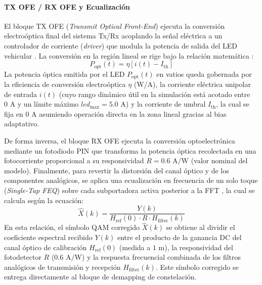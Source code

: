 \paragraph{TX OFE / RX OFE y Ecualización}
El bloque TX OFE (\textit{Transmit Optical Front-End}) ejecuta la conversión electroóptica final del sistema Tx/Rx acoplando la señal eléctrica a un controlador de corriente (\textit{driver}) que modula la potencia de salida del LED vehicular \cite{ghassemlooy2019optical}. La conversión en la región lineal se rige bajo la relación matemática \cite{ghassemlooy2019optical}:
\begin{equation}
	P_{\text{opt}}(t) = \eta \left[ i(t) - I_{\text{th}} \right]
	\label{eq:p_opt_conv}
\end{equation}
La potencia óptica emitida por el LED $P_{\text{opt}}(t)$ en vatios queda gobernada por la eficiencia de conversión electroóptica $\eta$ (W/A), la corriente eléctrica unipolar de entrada $i(t)$ (cuyo rango dinámico útil en la simulación está acotado entre $0\text{~A}$ y un límite máximo $led_{\text{max}} = 5.0\text{~A}$) y la corriente de umbral $I_{\text{th}}$, la cual se fija en $0\text{~A}$ asumiendo operación directa en la zona lineal gracias al bias adaptativo.

De forma inversa, el bloque RX OFE ejecuta la conversión optoelectrónica mediante un fotodiodo PIN que transforma la potencia óptica recolectada en una fotocorriente proporcional a su responsividad $R = 0.6\text{ A/W}$ (valor nominal del modelo). Finalmente, para revertir la distorsión del canal óptico y de los componentes analógicos, se aplica una ecualización en frecuencia de un solo toque (\textit{Single-Tap FEQ}) sobre cada subportadora activa posterior a la FFT \cite{elgala2011indoor}, la cual se calcula según la ecuación:
\begin{equation}
	\hat{X}(k) = \frac{Y(k)}{H_{\text{ref}}(0) \cdot R \cdot H_{\text{filter}}(k)}
	\label{eq:feq_theory}
\end{equation}
En esta relación, el símbolo QAM corregido $\hat{X}(k)$ se obtiene al dividir el coeficiente espectral recibido $Y(k)$ entre el producto de la ganancia DC del canal óptico de calibración $H_{\text{ref}}(0)$ (medida a $1\text{~m}$), la responsividad del fotodetector $R$ ($0.6\text{~A/W}$) y la respuesta frecuencial combinada de los filtros analógicos de transmisión y recepción $H_{\text{filter}}(k)$. Este símbolo corregido se entrega directamente al bloque de demapping de constelación.




